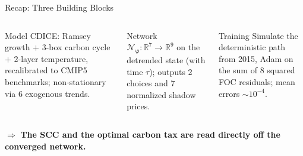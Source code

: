 \documentclass[aspectratio=169,11pt]{beamer}
\newcommand{\R}{\mathbb{R}}
\newcommand{\nn}{\mathcal{N}_{\bm{\varphi}}}
\begin{document}
\begin{frame}{Recap: Three Building Blocks}
\begin{columns}[T]
\begin{block}{Model}
\centering
\small
CDICE: Ramsey growth $+$ 3-box carbon cycle $+$ 2-layer temperature, recalibrated to CMIP5 benchmarks; non-stationary via 6 exogenous trends.
\end{block}

\begin{block}{Network}
\centering
\small
$\nn: \R^{7} \to \R^{9}$ on the detrended state (with time $\tau$); outputs 2 choices and 7 normalized shadow prices.
\end{block}

\begin{block}{Training}
\centering
\small
Simulate the deterministic path from 2015, Adam on the sum of 8 squared FOC residuals; mean errors $\sim 10^{-4}$.
\end{block}
\end{columns}

\vspace{0.8em}
\begin{center}
$\Rightarrow$ \textbf{The SCC and the optimal carbon tax are read directly off the converged network.}
\end{center}
\end{frame}


\end{document}
